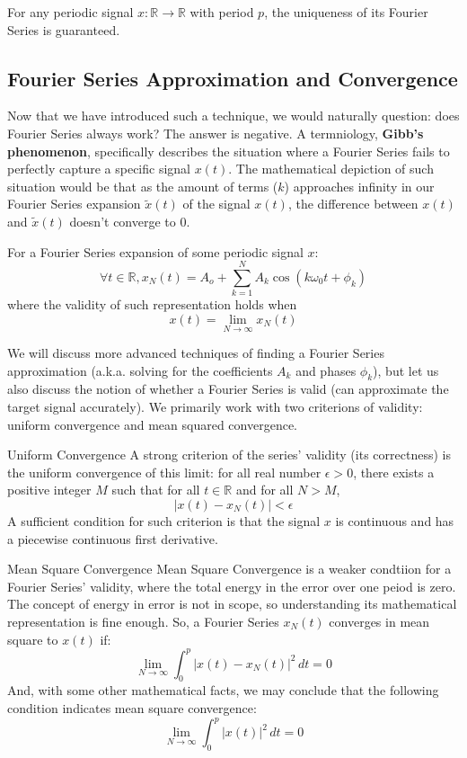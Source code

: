 For any periodic signal $x: \mathbb{R} \rightarrow \mathbb{R}$ with period $p$, the uniqueness of its Fourier Series is guaranteed.

\subsection{Fourier Series Approximation and Convergence}
Now that we have introduced such a technique, we would naturally question: does Fourier Series always work?
The answer is negative.
A termniology, \textbf{Gibb's phenomenon}, specifically describes the situation where a Fourier Series fails to perfectly capture a specific signal $x(t)$.
The mathematical depiction of such situation would be that as the amount of terms ($k$) approaches infinity in our Fourier Series expansion $\tilde{x}(t)$ of the signal $x(t)$, the difference between $x(t)$ and $\tilde{x}(t)$ doesn't converge to $0$.

For a Fourier Series expansion of some periodic signal $x$:
\[
    \forall t \in \mathbb{R}, x_N(t) = A_o + \sum_{k = 1}^N A_k \cos(k \omega_0 t + \phi_k)
\]
where the validity of such representation holds when
\[
    x(t) = \lim_{N \rightarrow \infty} x_N(t)
\]

We will discuss more advanced techniques of finding a Fourier Series approximation (a.k.a. solving for the coefficients $A_k$ and phases $\phi_k$), but let us also discuss the notion of whether a Fourier Series is valid (can approximate the target signal accurately).
We primarily work with two criterions of validity: uniform convergence and mean squared convergence.
\begin{ln-define}{Uniform Convergence}{}
    A strong criterion of the series' validity (its correctness) is the uniform convergence of this limit: for all real number $\epsilon > 0$, there exists a positive integer $M$ such that for all $t \in \mathbb{R}$ and for all $N > M$,
    \[
        |x(t) - x_N(t)| < \epsilon
    \]
    A sufficient condition for such criterion is that the signal $x$ is continuous and has a piecewise continuous first derivative.
\end{ln-define}
\begin{ln-define}{Mean Square Convergence}{}
    Mean Square Convergence is a weaker condtiion for a Fourier Series' validity, where the total energy in the error over one peiod is zero.
    The concept of energy in error is not in scope, so understanding its mathematical representation is fine enough.
    So, a Fourier Series $x_N(t)$ converges in mean square to $x(t)$ if:
    \[
        \lim_{N \rightarrow \infty} \int_0^p {|x(t) - x_N (t)|}^2 \,dt = 0
    \]
    And, with some other mathematical facts, we may conclude that the following condition indicates mean square convergence:
    \[
        \lim_{N \rightarrow \infty} \int_0^p {|x(t)|}^2 \,dt = 0
    \]
\end{ln-define}

